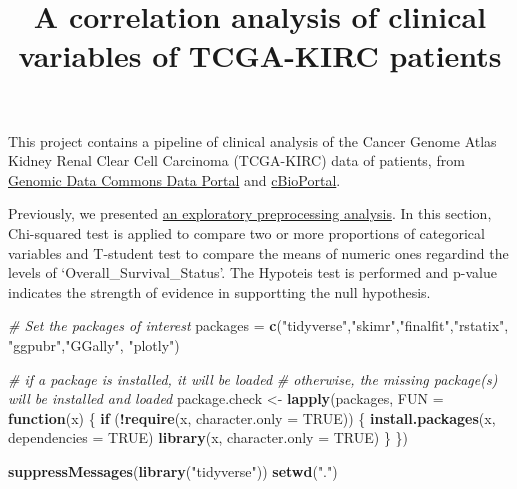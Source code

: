 \documentclass[]{article}
\title{A correlation analysis of clinical variables of TCGA-KIRC patients}
\author{}
\date{\vspace{-2.5em}}
\newenvironment{Shaded}{\begin{snugshade}}{\end{snugshade}}
\newcommand{\KeywordTok}[1]{\textcolor[rgb]{0.13,0.29,0.53}{\textbf{#1}}}
\newcommand{\DataTypeTok}[1]{\textcolor[rgb]{0.13,0.29,0.53}{#1}}
\newcommand{\StringTok}[1]{\textcolor[rgb]{0.31,0.60,0.02}{#1}}
\newcommand{\CommentTok}[1]{\textcolor[rgb]{0.56,0.35,0.01}{\textit{#1}}}
\newcommand{\OtherTok}[1]{\textcolor[rgb]{0.56,0.35,0.01}{#1}}
\newcommand{\ControlFlowTok}[1]{\textcolor[rgb]{0.13,0.29,0.53}{\textbf{#1}}}
\newcommand{\OperatorTok}[1]{\textcolor[rgb]{0.81,0.36,0.00}{\textbf{#1}}}
\newcommand{\NormalTok}[1]{#1}
\begin{document}
\maketitle

This project contains a pipeline of clinical analysis of the Cancer
Genome Atlas Kidney Renal Clear Cell Carcinoma (TCGA-KIRC) data of
patients, from
\href{https://portal.gdc.cancer.gov/exploration?filters=\%7B\%22op\%22\%3A\%22and\%22\%2C\%22content\%22\%3A\%5B\%7B\%22op\%22\%3A\%22in\%22\%2C\%22content\%22\%3A\%7B\%22field\%22\%3A\%22cases.project.project_id\%22\%2C\%22value\%22\%3A\%5B\%22TCGA-KIRC\%22\%5D\%7D\%7D\%5D\%7D}{Genomic
Data Commons Data Portal} and
\href{https://www.cbioportal.org/study/summary?id=kirp_tcga}{cBioPortal}.

Previously, we presented \href{1.preprocessing.md}{an exploratory
preprocessing analysis}. In this section, Chi-squared test is applied to
compare two or more proportions of categorical variables and T-student
test to compare the means of numeric ones regardind the levels of
`Overall\_Survival\_Status'. The Hypoteis test is performed and p-value
indicates the strength of evidence in supportting the null hypothesis.

\begin{Shaded}
\begin{Highlighting}[]
\CommentTok{# Set the packages of interest}
\NormalTok{packages =}\StringTok{ }\KeywordTok{c}\NormalTok{(}\StringTok{"tidyverse"}\NormalTok{,}\StringTok{"skimr"}\NormalTok{,}\StringTok{"finalfit"}\NormalTok{,}\StringTok{"rstatix"}\NormalTok{, }\StringTok{"ggpubr"}\NormalTok{,}\StringTok{"GGally"}\NormalTok{, }\StringTok{"plotly"}\NormalTok{)}

\CommentTok{# if a package is installed, it will be loaded}
\CommentTok{# otherwise, the missing package(s) will be installed and loaded}
\NormalTok{package.check <-}\StringTok{ }\KeywordTok{lapply}\NormalTok{(packages, }\DataTypeTok{FUN =} \ControlFlowTok{function}\NormalTok{(x) \{}
  \ControlFlowTok{if}\NormalTok{ (}\OperatorTok{!}\KeywordTok{require}\NormalTok{(x, }\DataTypeTok{character.only =} \OtherTok{TRUE}\NormalTok{)) \{}
    \KeywordTok{install.packages}\NormalTok{(x, }\DataTypeTok{dependencies =} \OtherTok{TRUE}\NormalTok{)}
    \KeywordTok{library}\NormalTok{(x, }\DataTypeTok{character.only =} \OtherTok{TRUE}\NormalTok{)}
\NormalTok{  \}}
\NormalTok{\})}

\KeywordTok{suppressMessages}\NormalTok{(}\KeywordTok{library}\NormalTok{(}\StringTok{"tidyverse"}\NormalTok{))}
\KeywordTok{setwd}\NormalTok{(}\StringTok{"."}\NormalTok{)}
\end{Highlighting}
\end{Shaded}
\end{document}
